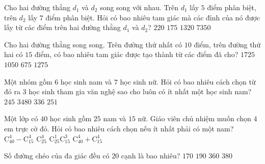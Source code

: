 \begin{ex}%
Cho hai đường thẳng $d_{1}$ và $d_{2}$ song song với nhau. Trên $d_{1}$ lấy $5$ điểm phân biệt, trên $d_{2}$ lấy $7$ điểm phân biệt. Hỏi có bao nhiêu tam giác mà các đỉnh của nó được lấy từ các điểm trên hai đường thằng $d_{1}$ và $d_{2}$?
\choice
{$220$}
{\True $175$}
{$1320$}
{$7350$}
\end{ex}

\begin{ex}%
Cho hai đường thằng song song. Trên đường thứ nhất có $10$ điểm, trên đường thứ hai có $15$ điểm, có bao nhiêu tam giác được tạo thành từ các điểm đã cho?
\choice
{\True $1725$}
{$1050$}
{$675$}
{$1275$}
\end{ex}

\begin{ex}%
Một nhóm gồm $6$ học sinh nam và $7$ học sinh nữ. Hỏi có bao nhiêu cách chọn từ đó ra $3$ học sinh tham gia văn nghệ sao cho luôn có ít nhất một học sinh nam?
\choice
{$245$}
{$3480$}
{$336$}
{\True $251$}
\end{ex}

\begin{ex}%
Một lớp có $40$ học sinh gồm $25$ nam và $15$ nữ. Giáo viên chủ nhiệm muốn chọn $4$ em trực cờ đỏ. Hỏi có bao nhiêu cách chọn nếu ít nhất phải có một nam?
\choice
{\True $\mathrm{C}_{40}^{4}-\mathrm{C}_{15}^{4}$}
{$\mathrm{C}_{25}^{4}$}
{$\mathrm{C}_{25}^{1} \mathrm{C}_{15}^{3}$}
{$\mathrm{C}_{40}^{4}+\mathrm{C}_{15}^{4}$}
\end{ex}

\begin{ex}%
Số đường chéo của đa giác đều có $20$ cạnh là bao nhiêu?
\choice
{\True $170$}
{$190$}
{$360$}
{$380$}
\end{ex}
